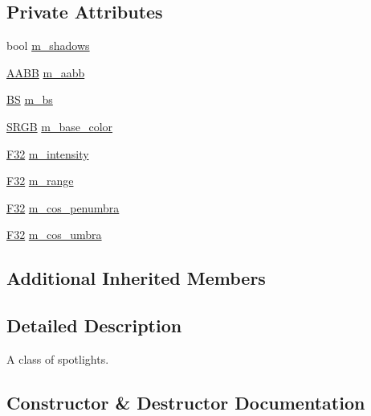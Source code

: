 \subsection*{Private Attributes}
\begin{DoxyCompactItemize}
\item 
bool \hyperlink{classmage_1_1_spot_light_aa744a471d0f1b39eb5ee435611bb42fe}{m\+\_\+shadows}
\item 
\hyperlink{classmage_1_1_a_a_b_b}{A\+A\+BB} \hyperlink{classmage_1_1_spot_light_ae0e1342ef7e3ca044bb1f16c4c3327a1}{m\+\_\+aabb}
\item 
\hyperlink{classmage_1_1_b_s}{BS} \hyperlink{classmage_1_1_spot_light_ab1adda3579072bff80041b422f7eed19}{m\+\_\+bs}
\item 
\hyperlink{structmage_1_1_s_r_g_b}{S\+R\+GB} \hyperlink{classmage_1_1_spot_light_af61462cf792ad5c713af8d849fa17309}{m\+\_\+base\+\_\+color}
\item 
\hyperlink{namespacemage_aa97e833b45f06d60a0a9c4fc22ae02c0}{F32} \hyperlink{classmage_1_1_spot_light_a79110b6604c73210ba13725be7b66606}{m\+\_\+intensity}
\item 
\hyperlink{namespacemage_aa97e833b45f06d60a0a9c4fc22ae02c0}{F32} \hyperlink{classmage_1_1_spot_light_a53922fe395997f12003cd2dbc2f3ca7a}{m\+\_\+range}
\item 
\hyperlink{namespacemage_aa97e833b45f06d60a0a9c4fc22ae02c0}{F32} \hyperlink{classmage_1_1_spot_light_ac4448bbc1c8a924141d2798c3365047a}{m\+\_\+cos\+\_\+penumbra}
\item 
\hyperlink{namespacemage_aa97e833b45f06d60a0a9c4fc22ae02c0}{F32} \hyperlink{classmage_1_1_spot_light_aa2ec430d0f95d082112260b5d9640d50}{m\+\_\+cos\+\_\+umbra}
\end{DoxyCompactItemize}
\subsection*{Additional Inherited Members}


\subsection{Detailed Description}
A class of spotlights. 

\subsection{Constructor \& Destructor Documentation}
\hypertarget{classmage_1_1_spot_light_ae82577a45cf84c375a58b1789a05ce0d}{}\label{classmage_1_1_spot_light_ae82577a45cf84c375a58b1789a05ce0d} 
